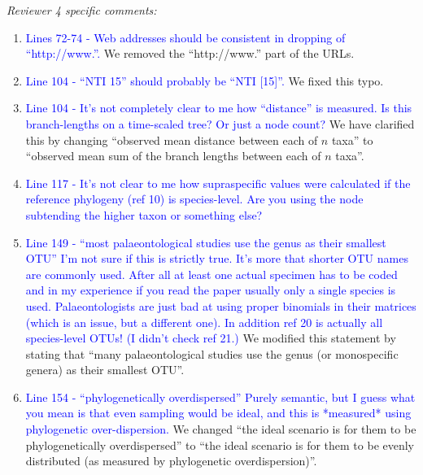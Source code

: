 \documentclass[12pt,letterpaper]{article}
\renewcommand{\subsection}[1]{%
\bigskip
\begin{center}
\begin{large}
\normalfont\itshape #1
\end{large}
\end{center}}
\begin{document}
\subsection{Reviewer 4 specific comments:}
\begin{enumerate}
\item{\textcolor{blue}{Lines 72-74 - Web addresses should be consistent in dropping of ``http://www.''.}}
We removed the ``http://www.'' part of the URLs.

\item{\textcolor{blue}{Line 104 - ``NTI 15'' should probably be ``NTI [15]''.}}
We fixed this typo.

\item{\textcolor{blue}{Line 104 - It's not completely clear to me how ``distance'' is measured. Is this branch-lengths on a time-scaled tree? Or just a node count?}}
We have clarified this by changing ``observed mean distance between each of $n$ taxa'' to ``observed mean sum of the branch lengths between each of $n$ taxa''. %

\item{\textcolor{blue}{Line 117 - It's not clear to me how supraspecific values were calculated if the reference phylogeny (ref 10) is species-level. Are you using the node subtending the higher taxon or something else?}}

\item{\textcolor{blue}{Line 149 - ``most palaeontological studies use the genus as their smallest OTU'' I'm not sure if this is strictly true. It's more that shorter OTU names are commonly used. After all at least one actual specimen has to be coded and in my experience if you read the paper usually only a single species is used. Palaeontologists are just bad at using proper binomials in their matrices (which is an issue, but a different one). In addition ref 20 is actually all species-level OTUs! (I didn't check ref 21.)}}
We modified this statement by stating that ``many palaeontological studies use the genus (or monospecific genera) as their smallest OTU''.

\item{\textcolor{blue}{Line 154 - ``phylogenetically overdispersed'' Purely semantic, but I guess what you mean is that even sampling would be ideal, and this is *measured* using phylogenetic over-dispersion.}}
We changed ``the ideal scenario is for them to be phylogenetically overdispersed'' to ``the ideal scenario is for them to be evenly distributed (as measured by phylogenetic overdispersion)''.


\end{enumerate}
\end{document}
